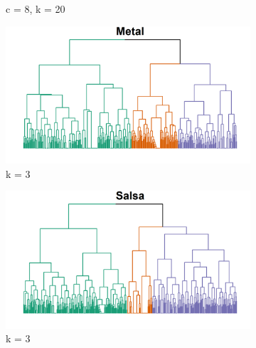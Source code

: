 \documentclass[a4paper,12pt]{extarticle}
\begin{document}
\begin{figure}[t!]
\begin{subfigure}[b]{0.5\textwidth}
        \caption{c = 8, k = 20}
        \label{fig:dend-macro-labels}
    \end{subfigure} 
     \begin{subfigure}[b]{0.5\textwidth}
        \centering
        \includegraphics[width=1.0\textwidth]{Plots/Dend/metal-branches.png}
        \caption{k = 3}
        \label{fig:dend-micro-metal}
    \end{subfigure}
     \begin{subfigure}[b]{0.5\textwidth}
        \centering
        \includegraphics[width=1.0\textwidth]{Plots/Dend/salsa-branches.png}
        \caption{k = 3}
        \label{fig:dend-micro-salsa}
    \end{subfigure}
    \caption{}
    \label{fig:dend}
 \end{figure}
 
\end{document}
